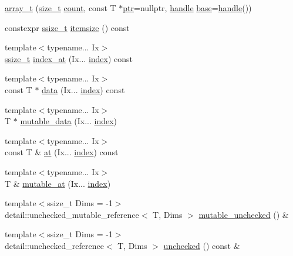 \begin{DoxyCompactItemize}
\item 
\mbox{\hyperlink{classarray__t_a130630a78f09e64673c5524ded69a368}{array\+\_\+t}} (\mbox{\hyperlink{detail_2common_8h_a801d6a451a01953ef8cbae6feb6a3638}{size\+\_\+t}} \mbox{\hyperlink{_s_d_l__opengl_8h_a619bc20e8198de3bd3f3d7fc34de66b2}{count}}, const T $\ast$\mbox{\hyperlink{classhandle_afcd412ba4cbffd7d1e3c9338746b2682}{ptr}}=nullptr, \mbox{\hyperlink{classhandle}{handle}} \mbox{\hyperlink{structbase}{base}}=\mbox{\hyperlink{classhandle}{handle}}())
\item 
constexpr \mbox{\hyperlink{detail_2common_8h_ac430d16fc097b3bf0a7469cfd09decda}{ssize\+\_\+t}} \mbox{\hyperlink{classarray__t_a59865c505f703937ca2b021e9e9b7a35}{itemsize}} () const
\item 
{\footnotesize template$<$typename... Ix$>$ }\\\mbox{\hyperlink{detail_2common_8h_ac430d16fc097b3bf0a7469cfd09decda}{ssize\+\_\+t}} \mbox{\hyperlink{classarray__t_a3702471be3f9fc83f0e96a6a9807388b}{index\+\_\+at}} (Ix... \mbox{\hyperlink{_s_d_l__opengl__glext_8h_a57f14e05b1900f16a2da82ade47d0c6d}{index}}) const
\item 
{\footnotesize template$<$typename... Ix$>$ }\\const T $\ast$ \mbox{\hyperlink{classarray__t_a1eae48d28e1f9dc082a1fb09b7aa1bfe}{data}} (Ix... \mbox{\hyperlink{_s_d_l__opengl__glext_8h_a57f14e05b1900f16a2da82ade47d0c6d}{index}}) const
\item 
{\footnotesize template$<$typename... Ix$>$ }\\T $\ast$ \mbox{\hyperlink{classarray__t_a551b2c0bd74938c8595eb698805fa8fb}{mutable\+\_\+data}} (Ix... \mbox{\hyperlink{_s_d_l__opengl__glext_8h_a57f14e05b1900f16a2da82ade47d0c6d}{index}})
\item 
{\footnotesize template$<$typename... Ix$>$ }\\const T \& \mbox{\hyperlink{classarray__t_af237ba43b0ef8a7614f31c40ab1fc3e7}{at}} (Ix... \mbox{\hyperlink{_s_d_l__opengl__glext_8h_a57f14e05b1900f16a2da82ade47d0c6d}{index}}) const
\item 
{\footnotesize template$<$typename... Ix$>$ }\\T \& \mbox{\hyperlink{classarray__t_a91639da87d93b97302adebd892ee5d20}{mutable\+\_\+at}} (Ix... \mbox{\hyperlink{_s_d_l__opengl__glext_8h_a57f14e05b1900f16a2da82ade47d0c6d}{index}})
\item 
{\footnotesize template$<$ssize\+\_\+t Dims = -\/1$>$ }\\detail\+::unchecked\+\_\+mutable\+\_\+reference$<$ T, Dims $>$ \mbox{\hyperlink{classarray__t_a04bd133a0cfeab8df20d69b160027258}{mutable\+\_\+unchecked}} () \&
\item 
{\footnotesize template$<$ssize\+\_\+t Dims = -\/1$>$ }\\detail\+::unchecked\+\_\+reference$<$ T, Dims $>$ \mbox{\hyperlink{classarray__t_a97bf54c6d71ac61d4a8a311d49fc3dff}{unchecked}} () const \&
\end{DoxyCompactItemize}

